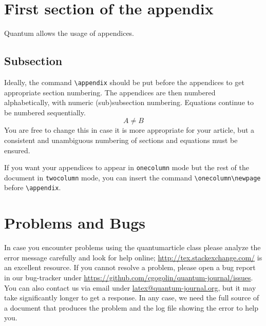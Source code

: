 \documentclass[a4paper,twocolumn,superscriptaddress,11pt,accepted=2017-05-09]{quantumarticle}
\begin{document}
\onecolumn\newpage
\appendix

\section{First section of the appendix}
Quantum allows the usage of appendices.

\subsection{Subsection}
Ideally, the command \texttt{\textbackslash{}appendix} should be put before the appendices to get appropriate section numbering.
The appendices are then numbered alphabetically, with numeric (sub)subsection numbering.
Equations continue to be numbered sequentially.
\begin{equation}
  A \neq B
\end{equation}
You are free to change this in case it is more appropriate for your article, but a consistent and unambiguous numbering of sections and equations must be ensured.

If you want your appendices to appear in \texttt{onecolumn} mode but the rest of the document in \texttt{twocolumn} mode, you can insert the command \texttt{\textbackslash{}onecolumn\textbackslash{}newpage} before \texttt{\textbackslash{}appendix}.   

\section{Problems and Bugs}
In case you encounter problems using the quantumarticle class please analyze the error message carefully and look for help online; \href{http://tex.stackexchange.com/}{http://tex.stackexchange.com/} is an excellent resource.
If you cannot resolve a problem, please open a bug report in our bug-tracker under \href{https://github.com/cgogolin/quantum-journal/issues}{https://github.com/cgogolin/quantum-journal/issues}.
You can also contact us via email under \href{mailto:latex@quantum-journal.org}{latex@quantum-journal.org}, but it may take significantly longer to get a response.
In any case, we need the full source of a document that produces the problem and the log file showing the error to help you.
\end{document}
